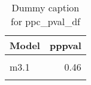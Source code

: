 \begin{table}
\centering
\caption{Dummy caption for ppc_pval_df}
\centering
\fontsize{10}{12}\selectfont
\begin{tabular}[t]{lr}
\toprule
Model & pppval\\
\midrule
\cellcolor{gray!10}{m2} & \cellcolor{gray!10}{0.46}\\
m3.1 & 0.46\\
\cellcolor{gray!10}{m4} & \cellcolor{gray!10}{0.44}\\
\bottomrule
\end{tabular}
\end{table}
